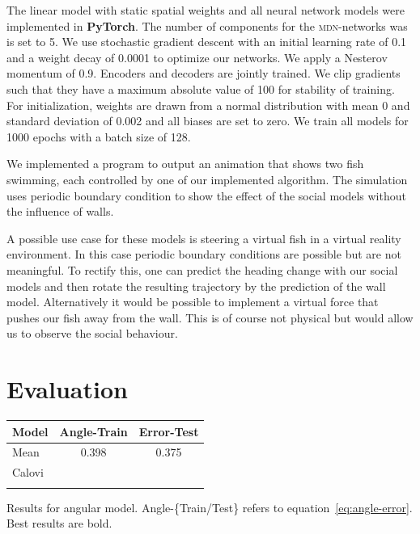 \documentclass[nobib, a4paper]{tufte-handout}
\begin{document}
The linear model with static spatial weights and all neural network models were implemented in \textbf{PyTorch}.
The number of components for the \textsc{mdn}-networks was is set to 5.
We use stochastic gradient descent with an initial learning rate of 0.1 and a weight decay of 0.0001 to optimize our networks.
We apply a Nesterov momentum of 0.9.
Encoders and decoders are jointly trained.
We clip gradients such that they have a maximum absolute value of 100 for stability of training.
For initialization, weights are drawn from a normal distribution with mean 0 and standard deviation of 0.002 and all biases are set to zero.
We train all models for 1000 epochs with a batch size of 128.

We implemented a program to output an animation that shows two fish swimming, each controlled by one of our implemented algorithm.
The simulation uses periodic boundary condition to show the effect of the social models without the influence of walls.

A possible use case for these models is steering a virtual fish in a virtual reality environment.
In this case periodic boundary conditions are possible but are not meaningful.
To rectify this, one can predict the heading change with our social models and then rotate the resulting trajectory by the prediction of the wall model.
Alternatively it would be possible to implement a virtual force that pushes our fish away from the wall.
This is of course not physical but would allow us to observe the social behaviour.

\section{Evaluation}
\begin{margintable}[5cm]
\centering
\begin{tabular}{@{}lS[table-format=1.3]S[table-format=1.3]@{}}
\toprule
{Model} & {Angle-Train} & {Error-Test} \\ \midrule
Mean & 0.398 & 0.375 \\ 
  Calovi &  & \\ %
\bottomrule\\
\end{tabular}
\caption{Results for angular model.
  Angle-\{Train/Test\} refers to equation~\ref{eq:angle-error}.
  Best results are bold.
}
\label{tab:results-wall}
\end{margintable}
\end{document}
